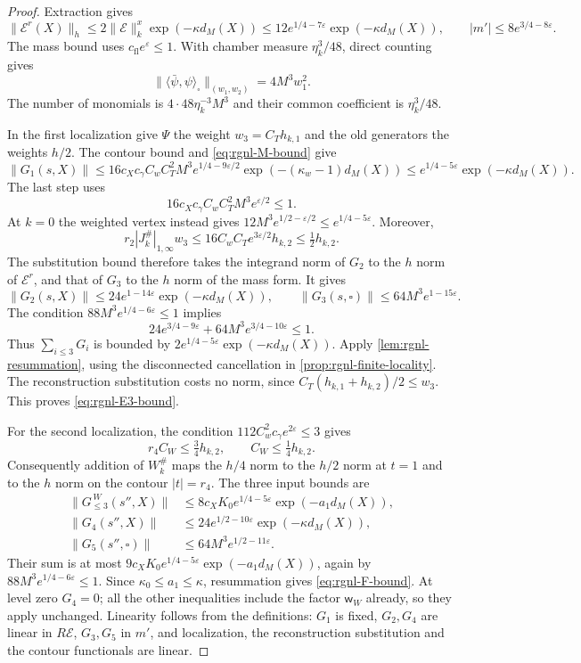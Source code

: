 \begin{proof}
Extraction gives
\[
 \|\mathscr E^r(X)\|_h\le2\|\mathscr E\|_k^x\exp(-\kappa d_M(X))
                   \le12e^{1/4-7\varepsilon}\exp(-\kappa d_M(X)),
 \qquad |m'|\le8e^{3/4-8\varepsilon}.
\]
The mass bound uses
$c_{\mathrm{fl}}e^\varepsilon\le1$.
With chamber measure $\eta_k^3/48$, direct counting gives
\[
 \|\langle\bar\psi,\psi\rangle_\square\|_{(w_1,w_2)}
                                                    =4M^3w_1^2.
\]
The number of monomials is
$4\cdot48\eta_k^{-3}M^3$ and their common coefficient
is $\eta_k^3/48$.

In the first localization give $\Psi$ the weight
$w_3=C_Th_{k,1}$ and the old generators the weights $h/2$.
The contour bound and \eqref{eq:rgnl-M-bound} give
\[
 \|G_1(s,X)\|\le
 16c_Xc_\gamma C_wC_T^2M^3e^{1/4-9\varepsilon/2}
                 \exp(-(\kappa_w-1)d_M(X))
 \le e^{1/4-5\varepsilon}\exp(-\kappa d_M(X)).
\]
The last step uses
\[
 16c_Xc_\gamma C_wC_T^2M^3e^{\varepsilon/2}\le1.
\]
At $k=0$ the weighted vertex instead gives
$12M^3e^{1/2-\varepsilon/2}\le e^{1/4-5\varepsilon}$.
Moreover,
\[
 r_2|J_k^\#|_{1,\infty}w_3
     \le16C_wC_Te^{3\varepsilon/2}h_{k,2}
     \le\tfrac12h_{k,2}.
\]
The substitution bound therefore takes the integrand norm
of $G_2$ to the $h$ norm of $\mathscr E^r$, and that of
$G_3$ to the $h$ norm of the mass form. It gives
\[
 \|G_2(s,X)\|\le24e^{1-14\varepsilon}\exp(-\kappa d_M(X)),
 \qquad \|G_3(s,\square)\|\le64M^3e^{1-15\varepsilon}.
\]
The condition $88M^3e^{1/4-6\varepsilon}\le1$ implies
\[
 24e^{3/4-9\varepsilon}
                   +64M^3e^{3/4-10\varepsilon}\le1.
\]
Thus $\sum_{i\le3}G_i$ is bounded by
$2e^{1/4-5\varepsilon}\exp(-\kappa d_M(X))$.
Apply \cref{lem:rgnl-resummation}, using the disconnected
cancellation in \cref{prop:rgnl-finite-locality}.
The reconstruction substitution costs no norm, since
$C_T(h_{k,1}+h_{k,2})/2\le w_3$.
This proves \eqref{eq:rgnl-E3-bound}.

For the second localization, the condition
$112C_w^2c_\gamma e^{2\varepsilon}\le3$ gives
\[
 r_4C_W\le\tfrac34h_{k,2},\qquad C_W\le\tfrac14h_{k,2}.
\]
Consequently addition of $W_k^\#$ maps the $h/4$ norm
to the $h/2$ norm at $t=1$ and to the $h$ norm on
the contour $|t|=r_4$. The three input bounds are
\begin{align*}
 \|G_{\le3}^{\,W}(s'',X)\|
       &\le8c_XK_0e^{1/4-5\varepsilon}\exp(-a_1d_M(X)),\\
 \|G_4(s'',X)\|&\le24e^{1/2-10\varepsilon}\exp(-\kappa d_M(X)),\\
 \|G_5(s'',\square)\|&\le64M^3e^{1/2-11\varepsilon}.
\end{align*}
Their sum is at most
$9c_XK_0e^{1/4-5\varepsilon}\exp(-a_1d_M(X))$,
again by $88M^3e^{1/4-6\varepsilon}\le1$.
Since $\kappa_0\le a_1\le\kappa$, resummation gives
\eqref{eq:rgnl-F-bound}.
At level zero $G_4=0$; all the other inequalities include
the factor $\mathsf w_W$ already, so they apply unchanged.
Linearity follows from the definitions: $G_1$ is fixed,
$G_2,G_4$ are linear in $R\mathscr E$, $G_3,G_5$ in $m'$,
and localization, the reconstruction substitution and the
contour functionals are linear.
\end{proof}

